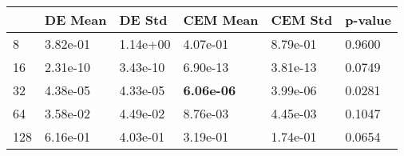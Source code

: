\begin{tabular}{llllll}
\toprule
{} &   DE Mean &    DE Std &           CEM Mean &   CEM Std & p-value \\
\midrule
8   &  3.82e-01 &  1.14e+00 &           4.07e-01 &  8.79e-01 &  0.9600 \\
16  &  2.31e-10 &  3.43e-10 &           6.90e-13 &  3.81e-13 &  0.0749 \\
32  &  4.38e-05 &  4.33e-05 &  \textbf{6.06e-06} &  3.99e-06 &  0.0281 \\
64  &  3.58e-02 &  4.49e-02 &           8.76e-03 &  4.45e-03 &  0.1047 \\
128 &  6.16e-01 &  4.03e-01 &           3.19e-01 &  1.74e-01 &  0.0654 \\
\bottomrule
\end{tabular}

